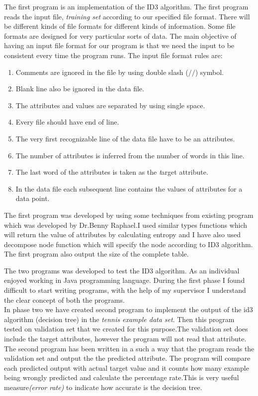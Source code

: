 \documentclass{report}
\begin{document}
The first program is an implementation of the ID3 algorithm. The first program reads the input file, \emph{training set} according to our specified file format. There will be different kinds of file formats for different kinds of information. Some file formats are designed for very particular sorts of data. The main objective of having an input file format for our program is that we need the input to be consistent every time the program runs. The input file format rules are:

\begin{enumerate}

\item Comments are ignored in the file by using double slash ($//$) symbol. 
\item Blank line also be ignored in the data file.
\item The attributes and values are separated by using single space.
\item Every file should have end of line.
\item The very first recognizable line of the data file have to be an attributes.
\item The number of attributes is inferred from the number of words in this line.
\item The last word of the attributes is taken as the {\emph target attribute. }
\item In the data file each subsequent line contains the values of attributes for a data point.
\end{enumerate}

The first program was developed by using some techniques from existing program which was developed by Dr.Benny Raphael\cite{ID3Algorithm}.I used similar types functions which will return the value of attributes by calculating entropy \cite{ID3Algorithm} and I have also used decompose node function \cite{ID3Algorithm} which will specify the node according to ID3 algorithm. The first program also output the size of the complete table.

The two programs was developed to test the ID3 algorithm. As an individual enjoyed working in Java programming language. During the first phase I found difficult to start writing programs, with the help of my supervisor I understand the clear concept of both the programs.\\
In phase two we have created second program to implement the output of the id3 algorithm (decision tree) in the \emph{tennis example data set}. Then this program tested on validation set that we created for this purpose.The validation set does include the target attributes, however the program will not read that attribute. The second program has been written in a such a way that the program reads the validation set and output the the predicted attribute. 
The program will compare each predicted output with actual target value and it counts how many example being wrongly predicted and calculate the percentage rate.This is very useful measure\emph{(error rate)} to indicate how accurate is the decision tree. 
\end{document}
